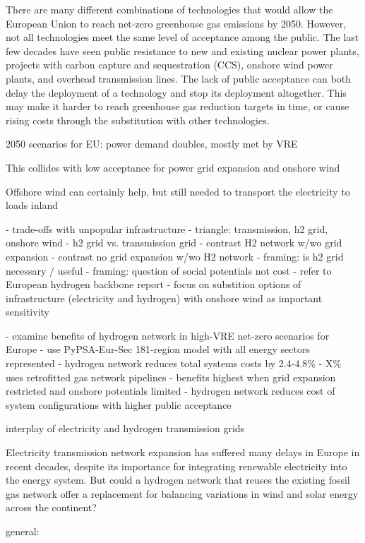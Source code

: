 There are many different combinations of technologies that would allow
the European Union to reach net-zero greenhouse gas emissions by
2050. However, not all technologies meet the same level of acceptance
among the public. The last few decades have seen public resistance to
new and existing nuclear power plants, projects with carbon capture
and sequestration (CCS), onshore wind power plants, and overhead
transmission lines. The lack of public acceptance can both delay the
deployment of a technology and stop its deployment altogether. This
may make it harder to reach greenhouse gas reduction targets in time,
or cause rising costs through the substitution with other
technologies.

2050 scenarios for EU: power demand doubles, mostly met by VRE

This collides with low acceptance for power grid expansion and onshore wind

Offshore wind can certainly help, but still needed to transport the electricity to loads inland

- trade-offs with unpopular infrastructure
- triangle: transmission, h2 grid, onshore wind
- h2 grid vs. transmission grid
	- contrast H2 network w/wo grid expansion
	- contrast no grid expansion w/wo H2 network
- framing: is h2 grid necessary / useful
- framing: question of social potentials not cost
- refer to European hydrogen backbone report
- focus on substition options of infrastructure (electricity and hydrogen) with onshore wind as important sensitivity

- examine benefits of hydrogen network in high-VRE net-zero scenarios for Europe
- use PyPSA-Eur-Sec 181-region model with all energy sectors represented
- hydrogen network reduces total systems costs by 2.4-4.8\%
- X\% uses retrofitted gas network pipelines
- benefits highest when grid expansion restricted and onshore potentials limited
- hydrogen network reduces cost of system configurations with higher public acceptance

interplay of electricity and hydrogen transmission grids

Electricity transmission network expansion has suffered many delays in
Europe in recent decades, despite its importance for integrating
renewable electricity into the energy system. But could a hydrogen
network that reuses the existing fossil gas network offer a replacement
for balancing variations in wind and solar energy across the continent?

general:
\cite{
    mckennaScenicnessAssessment2021,
    krummModellingSocial2022,
    weinandImpactPublic2021,
    weinandExploringTrilemma,
    trondleTradeOffsGeographic2020,
    sasseDistributionalTradeoffs2019,
    sasseRegionalImpacts2020,
    ludererImpactDeclining2021,
    EuropeanHydrogen,
    victoria2020,
    victoriaSpeedTechnological2021,
    lombardiPolicyDecision2020,
    tsiropoulosNetzeroEmissions2020,
    europeancommission.directorategeneralforenergy.METISStudy2021,
    deutschNoRegretHydrogen,
    tafarteQuantifyingTrade,
    lehmannManagingSpatial}


